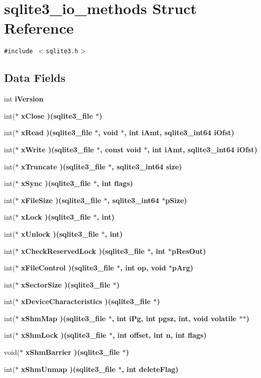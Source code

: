 \section{sqlite3\_\-io\_\-methods Struct Reference}
\label{structsqlite3__io__methods}
{\tt \#include $<$sqlite3.h$>$}

\subsection*{Data Fields}
\begin{CompactItemize}
\item 
int \bf{i\-Version}
\item 
int($\ast$ \bf{x\-Close} )(\bf{sqlite3\_\-file} $\ast$)
\item 
int($\ast$ \bf{x\-Read} )(\bf{sqlite3\_\-file} $\ast$, void $\ast$, int i\-Amt, \bf{sqlite3\_\-int64} i\-Ofst)
\item 
int($\ast$ \bf{x\-Write} )(\bf{sqlite3\_\-file} $\ast$, const void $\ast$, int i\-Amt, \bf{sqlite3\_\-int64} i\-Ofst)
\item 
int($\ast$ \bf{x\-Truncate} )(\bf{sqlite3\_\-file} $\ast$, \bf{sqlite3\_\-int64} size)
\item 
int($\ast$ \bf{x\-Sync} )(\bf{sqlite3\_\-file} $\ast$, int flags)
\item 
int($\ast$ \bf{x\-File\-Size} )(\bf{sqlite3\_\-file} $\ast$, \bf{sqlite3\_\-int64} $\ast$p\-Size)
\item 
int($\ast$ \bf{x\-Lock} )(\bf{sqlite3\_\-file} $\ast$, int)
\item 
int($\ast$ \bf{x\-Unlock} )(\bf{sqlite3\_\-file} $\ast$, int)
\item 
int($\ast$ \bf{x\-Check\-Reserved\-Lock} )(\bf{sqlite3\_\-file} $\ast$, int $\ast$p\-Res\-Out)
\item 
int($\ast$ \bf{x\-File\-Control} )(\bf{sqlite3\_\-file} $\ast$, int op, void $\ast$p\-Arg)
\item 
int($\ast$ \bf{x\-Sector\-Size} )(\bf{sqlite3\_\-file} $\ast$)
\item 
int($\ast$ \bf{x\-Device\-Characteristics} )(\bf{sqlite3\_\-file} $\ast$)
\item 
int($\ast$ \bf{x\-Shm\-Map} )(\bf{sqlite3\_\-file} $\ast$, int i\-Pg, int pgsz, int, void volatile $\ast$$\ast$)
\item 
int($\ast$ \bf{x\-Shm\-Lock} )(\bf{sqlite3\_\-file} $\ast$, int offset, int n, int flags)
\item 
void($\ast$ \bf{x\-Shm\-Barrier} )(\bf{sqlite3\_\-file} $\ast$)
\item 
int($\ast$ \bf{x\-Shm\-Unmap} )(\bf{sqlite3\_\-file} $\ast$, int delete\-Flag)
\end{CompactItemize}


